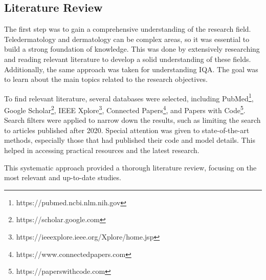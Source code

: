 \subsection{Literature Review}
\label{sub:LR}
The first step was to gain a comprehensive understanding of the research field. Teledermatology and dermatology can be complex areas, so it was essential to build a strong foundation of knowledge. This was done by extensively researching and reading relevant literature to develop a solid understanding of these fields. Additionally, the same approach was taken for understanding IQA. The goal was to learn about the main topics related to the research objectives.\par
\vspace{\baselineskip}
\noindent
To find relevant literature, several databases were selected, including PubMed\footnote{https://pubmed.ncbi.nlm.nih.gov}, Google Scholar\footnote{https://scholar.google.com}, IEEE Xplore\footnote{https://ieeexplore.ieee.org/Xplore/home.jsp}, Connected Papers\footnote{https://www.connectedpapers.com}, and Papers with Code\footnote{https://paperswithcode.com}. Search filters were applied to narrow down the results, such as limiting the search to articles published after 2020. Special attention was given to state-of-the-art methods, especially those that had published their code and model details. This helped in accessing practical resources and the latest research.\par
\vspace{\baselineskip}
\noindent
This systematic approach provided a thorough literature review, focusing on the most relevant and up-to-date studies. \par

